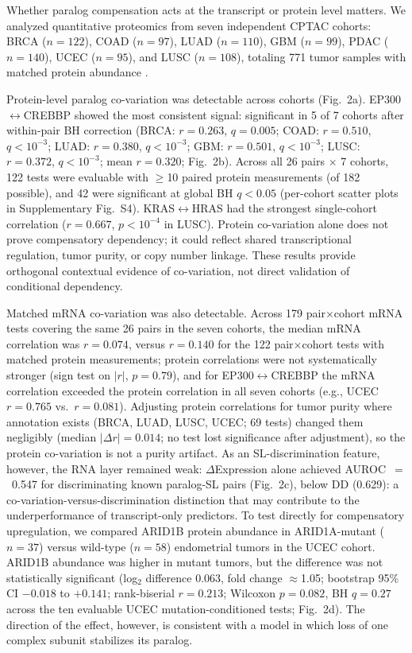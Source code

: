 \documentclass[11pt,a4paper]{article}
\begin{document}
Whether paralog compensation acts at the transcript or protein level matters. We analyzed quantitative proteomics from seven independent CPTAC cohorts: BRCA ($n=122$), COAD ($n=97$), LUAD ($n=110$), GBM ($n=99$), PDAC ($n=140$), UCEC ($n=95$), and LUSC ($n=108$), totaling 771 tumor samples with matched protein abundance \cite{Cerami2012,Gao2013,Edwards2015}.

Protein-level paralog co-variation was detectable across cohorts (Fig.~2a). EP300$\leftrightarrow$CREBBP showed the most consistent signal: significant in 5 of 7 cohorts after within-pair BH correction (BRCA: $r=0.263$, $q=0.005$; COAD: $r=0.510$, $q<10^{-3}$; LUAD: $r=0.380$, $q<10^{-3}$; GBM: $r=0.501$, $q<10^{-3}$; LUSC: $r=0.372$, $q<10^{-3}$; mean $r=0.320$; Fig.~2b). Across all 26 pairs $\times$ 7 cohorts, 122 tests were evaluable with $\ge$10 paired protein measurements (of 182 possible), and 42 were significant at global BH $q<0.05$ (per-cohort scatter plots in Supplementary Fig.~S4). KRAS$\leftrightarrow$HRAS had the strongest single-cohort correlation ($r=0.667$, $p<10^{-4}$ in LUSC). Protein co-variation alone does not prove compensatory dependency; it could reflect shared transcriptional regulation, tumor purity, or copy number linkage. These results provide orthogonal contextual evidence of co-variation, not direct validation of conditional dependency.

Matched mRNA co-variation was also detectable. Across 179 pair$\times$cohort mRNA tests covering the same 26 pairs in the seven cohorts, the median mRNA correlation was $r=0.074$, versus $r=0.140$ for the 122 pair$\times$cohort tests with matched protein measurements; protein correlations were not systematically stronger (sign test on $|r|$, $p=0.79$), and for EP300$\leftrightarrow$CREBBP the mRNA correlation exceeded the protein correlation in all seven cohorts (e.g., UCEC $r=0.765$ vs.\ $r=0.081$). Adjusting protein correlations for tumor purity where annotation exists (BRCA, LUAD, LUSC, UCEC; 69 tests) changed them negligibly (median $|\Delta r|=0.014$; no test lost significance after adjustment), so the protein co-variation is not a purity artifact. As an SL-discrimination feature, however, the RNA layer remained weak: $\Delta$Expression alone achieved AUROC~$=$~0.547 for discriminating known paralog-SL pairs (Fig.~2c), below DD (0.629): a co-variation-versus-discrimination distinction that may contribute to the underperformance of transcript-only predictors. To test directly for compensatory upregulation, we compared ARID1B protein abundance in ARID1A-mutant ($n=37$) versus wild-type ($n=58$) endometrial tumors in the UCEC cohort. ARID1B abundance was higher in mutant tumors, but the difference was not statistically significant (log$_2$ difference 0.063, fold change $\approx$1.05; bootstrap 95\% CI $-0.018$ to $+0.141$; rank-biserial $r=0.213$; Wilcoxon $p=0.082$, BH $q=0.27$ across the ten evaluable UCEC mutation-conditioned tests; Fig.~2d). The direction of the effect, however, is consistent with a model in which loss of one complex subunit stabilizes its paralog.
\end{document}
